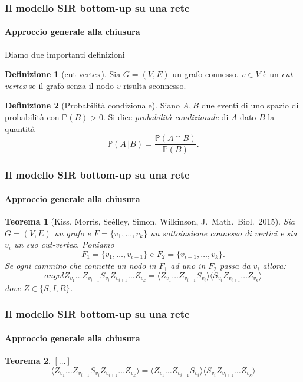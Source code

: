 \documentclass{beamer}
\newcommand{\angol}[1]{\langle #1 \rangle}
\theoremstyle{definition}
\newtheorem{defn}{Definizione}
\theoremstyle{plain}
\newtheorem{thm}{Teorema}
\begin{document}
{
\logo{}
\begin{frame}
\frametitle{Il modello SIR bottom-up su una rete}
\framesubtitle{Approccio generale alla chiusura}
Diamo due importanti definizioni
    \begin{defn}[cut-vertex]
    Sia $G=(V,E)$ un grafo connesso. $v\in V$ \`e un \textit{cut-vertex} se il grafo senza il nodo $v$ risulta sconnesso.
    \end{defn}
    \pause 
    \begin{defn}[Probabilit\`a condizionale]
    Siano $A,B$ due eventi di uno spazio di probabilit\`a con $\mathbb{P}(B)>0$. Si dice \textit{probabilit\`a condizionale} di $A$ dato $B$ la quantit\`a
    $$ \mathbb{P}(A\, \vert B) = \frac{ \mathbb{P}(A\cap B)}{\mathbb{P}(B)}.$$
    \end{defn}
\end{frame}

\begin{frame}
\frametitle{Il modello SIR bottom-up su una rete}
\framesubtitle{Approccio generale alla chiusura}
\begin{thm}[\small{Kiss, Morris, Se\'elley, Simon, Wilkinson, J.~Math.~Biol.~2015}]
Sia $G=(V,E)$ un grafo e $F=\{ v_1, \dots, v_k\}$ un sottoinsieme connesso di vertici e sia $v_i$ un suo cut-vertex. Poniamo  $$ F_1 = \{ v_1, \dots, v_{i-1}\} \text{ e }  F_2 =\{ v_{i+1}, \dots, v_k\}.$$ 
Se ogni cammino che connette un nodo in $F_1$ ad uno in $F_2$ passa da $v_i$ allora: 
\begin{equation*}angol{ Z_{v_1}\dots Z_{v_{i-1}} S_{v_i} Z_{v_{i+1}} \dots Z_{v_k}} = \angol{ Z_{v_1}\dots Z_{v_{i-1}} S_{v_i}} \angol{S_{v_i}  Z_{v_{i+1}} \dots Z_{v_k}}	
\end{equation*}
dove $Z\in \{ S,I,R\}$. 
\end{thm}
\end{frame}

\begin{frame}
\frametitle{Il modello SIR bottom-up su una rete}
\framesubtitle{Approccio generale alla chiusura}

\small {
\begin{thm} $[...]$
\begin{equation*}\angol{ Z_{v_1}\dots Z_{v_{i-1}} S_{v_i} Z_{v_{i+1}} \dots Z_{v_k}} = \angol{ Z_{v_1}\dots Z_{v_{i-1}} S_{v_i}} \angol{S_{v_i}  Z_{v_{i+1}} \dots Z_{v_k}}	
\end{equation*}
\end{thm}}



\end{frame}}
\end{document}
